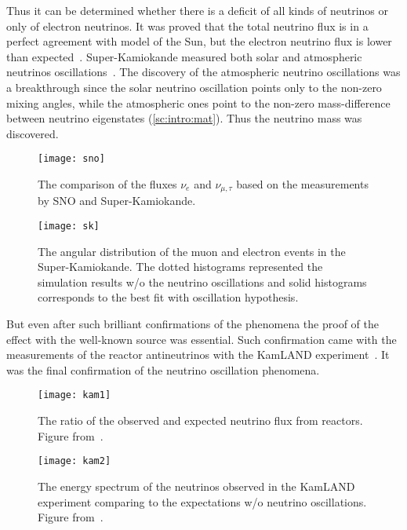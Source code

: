 \documentclass[../main.tex]{subfiles}
\begin{document}
Thus it can be determined whether there is a deficit of all kinds of neutrinos or only of electron neutrinos. It was proved that the total neutrino flux is in a perfect agreement with model of the Sun, but the electron neutrino flux is lower than expected~\cite{Ahmad2002}. Super-Kamiokande measured both solar and atmospheric neutrinos oscillations~\cite{Fukuda1999}. The discovery of the atmospheric neutrino oscillations was a breakthrough since the solar neutrino oscillation points only to the non-zero mixing angles, while the atmospheric ones point to the non-zero mass-difference between neutrino eigenstates (\autoref{sc:intro:mat}). Thus the neutrino mass was discovered.

\begin{figure}
  \centering
  \begin{minipage}{0.45\linewidth}
  \centering
    \texttt{[image: sno]}
    \caption{The comparison of the fluxes $\nu_e$ and $\nu_{\mu,\tau}$ based on the measurements by SNO and Super-Kamiokande.}
    \label{fig:intro:sno}
  \end{minipage}
  \begin{minipage}{0.09\linewidth}
    \hspace{\linewidth}
  \end{minipage}
  \begin{minipage}{0.45\linewidth}
  \centering
    \texttt{[image: sk]}
    \caption{The angular distribution of the muon and electron events in the Super-Kamiokande. The dotted histograms represented the simulation results w/o the neutrino oscillations and solid histograms corresponds to the best fit with oscillation hypothesis.}
    \label{fig:intro:sk}
  \end{minipage}
\end{figure}

But even after such brilliant confirmations of the phenomena the proof of the effect with the well-known source was essential. Such confirmation came with the measurements of the reactor antineutrinos with the KamLAND experiment~\cite{Eguchi2003}. It was the final confirmation of the neutrino oscillation phenomena.

\begin{figure}
  \centering
  \begin{minipage}{0.45\linewidth}
  \centering
    \texttt{[image: kam1]}
    \caption{The ratio of the observed and expected neutrino flux from reactors. Figure from~\cite{Eguchi2003}.}
    \label{fig:intro:kam1}
  \end{minipage}
  \begin{minipage}{0.09\linewidth}
    \hspace{\linewidth}
  \end{minipage}
  \begin{minipage}{0.45\linewidth}
  \centering
    \texttt{[image: kam2]}
    \caption{The energy spectrum of the neutrinos observed in the KamLAND experiment comparing to the expectations w/o neutrino oscillations. Figure from~\cite{Eguchi2003}.}
    \label{fig:intro:kam2}
  \end{minipage}
\end{figure}
\end{document}
